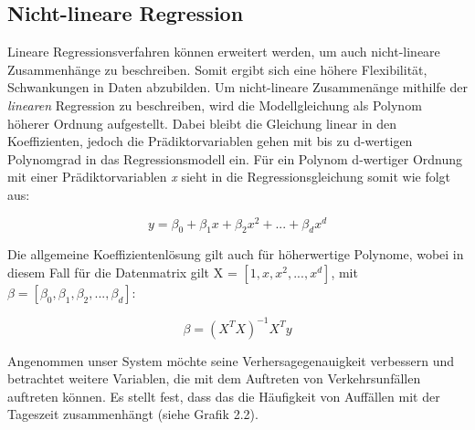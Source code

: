 \subsection{Nicht-lineare Regression}

Lineare Regressionsverfahren können erweitert werden, um auch nicht-lineare
Zusammenhänge zu beschreiben. Somit ergibt sich eine höhere Flexibilität,
Schwankungen in Daten abzubilden. Um nicht-lineare Zusammenänge mithilfe der
\emph{linearen} Regression zu beschreiben, wird die Modellgleichung als Polynom
höherer Ordnung aufgestellt. Dabei bleibt die Gleichung linear in den Koeffizienten,
jedoch die Prädiktorvariablen gehen mit bis zu d-wertigen Polynomgrad in das
Regressionsmodell ein. Für ein Polynom d-wertiger Ordnung mit einer
Prädiktorvariablen \emph{x} sieht in die Regressionsgleichung somit wie folgt aus:

\begin{equation*}
y = \beta_0 + \beta_1 x + \beta_2 x^2 + ... + \beta_d x^d
\end{equation*}

Die allgemeine Koeffizientenlösung gilt auch für höherwertige Polynome, wobei in
diesem Fall für die Datenmatrix gilt X = $[1, x, x^2, ..., x^d]$, mit $\beta =
[\beta_0, \beta_1, \beta_2, ..., \beta_d]$:

\begin{equation*}
\beta = (X^TX)^{-1}X^Ty
\end{equation*}

Angenommen unser System möchte seine Verhersagegenauigkeit verbessern und betrachtet
weitere Variablen, die mit dem Auftreten von Verkehrsunfällen auftreten können. Es
stellt fest, dass das die Häufigkeit von Auffällen mit der Tageszeit zusammenhängt
(siehe Grafik 2.2).


